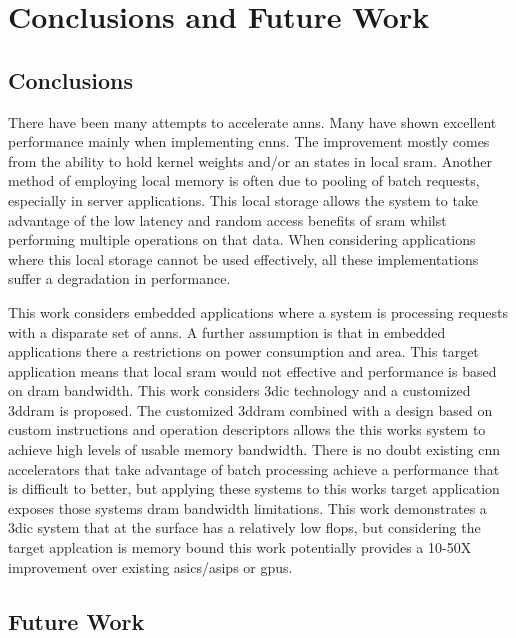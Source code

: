 
\chapter{Conclusions and Future Work}
\label{sec:Conclusions and Future Work}
\label{sec:chap-seven}

\section[Conclusions]{Conclusions}
\label{sec:Conclusions}

There have been many attempts to accelerate \acp{ann}. Many have shown excellent performance mainly when implementing \acp{cnn}. The improvement mostly comes from the ability to hold kernel weights and/or \ac{an} states in local \ac{sram}. 
Another method of employing local memory is often due to pooling of batch requests, especially in server applications.
This local storage allows the system to take advantage of the low latency and random access benefits of \ac{sram} whilst performing multiple operations on that data.
When considering applications where this local storage cannot be used effectively, all these implementations suffer a degradation in performance.

This work considers embedded applications where a system is processing requests with a disparate set of \acp{ann}. 
A further assumption is that in embedded applications there a restrictions on power consumption and area.
This target application means that local \ac{sram} would not effective and performance is based on \ac{dram} bandwidth.
This work considers \acf{3dic} technology and a customized \acf{3ddram} is proposed. 
The customized \ac{3ddram} combined with a design based on custom instructions and operation descriptors allows the this works system to achieve high levels of usable memory bandwidth.
There is no doubt existing \ac{cnn} accelerators that take advantage of batch processing achieve a performance that is difficult to better, but applying these systems to this works target application exposes those systems \ac{dram} bandwidth limitations.
This work demonstrates a \ac{3dic} system that at the surface has a relatively low \ac{flops}, but considering the target applcation is memory bound this work potentially provides a 10-50X improvement over existing \acp{asic}/\acp{asip} or \acp{gpu}.
\iffalse
given the target application, provides a potentially 10-50X performance improvement over existing ASIC/ASIPs or GPUs.
\fi

\section[Future Work]{Future Work}
\label{sec:Future Work}

